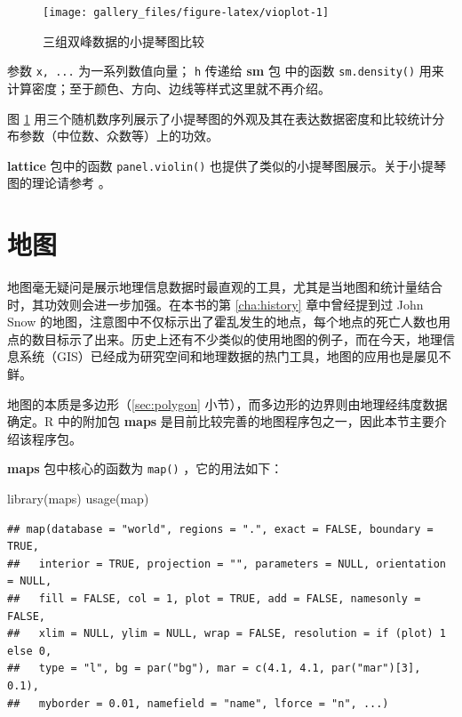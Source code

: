 \documentclass[
  b5paper,
  UTF8,twoside]{book}
\newenvironment{Shaded}{\begin{snugshade}}{\end{snugshade}}
\newcommand{\FunctionTok}[1]{\textcolor[rgb]{0.00,0.00,0.00}{#1}}
\newcommand{\NormalTok}[1]{#1}
\begin{document}
\begin{figure}

{\centering \texttt{[image: gallery\_files/figure-latex/vioplot-1]} 

}

\caption[三组双峰数据的小提琴图比较]{三组双峰数据的小提琴图比较}\label{fig:vioplot}
\end{figure}

参数 \texttt{x,\ ...} 为一系列数值向量； \texttt{h} 传递给 \textbf{sm} 包 \citep{sm} 中的函数 \texttt{sm.density()} 用来计算密度；至于颜色、方向、边线等样式这里就不再介绍。

图 \ref{fig:vioplot}
用三个随机数序列展示了小提琴图的外观及其在表达数据密度和比较统计分布参数（中位数、众数等）上的功效。

\textbf{lattice} 包中的函数 \texttt{panel.violin()} 也提供了类似的小提琴图展示。关于小提琴图的理论请参考 \citet{Hintze98}。

\hypertarget{sec:maps}{%
\section{地图}\label{sec:maps}}

地图毫无疑问是展示地理信息数据时最直观的工具，尤其是当地图和统计量结合时，其功效则会进一步加强。在本书的第 \ref{cha:history} 章中曾经提到过 John Snow 的地图，注意图中不仅标示出了霍乱发生的地点，每个地点的死亡人数也用点的数目标示了出来。历史上还有不少类似的使用地图的例子，而在今天，地理信息系统（GIS）已经成为研究空间和地理数据的热门工具，地图的应用也是屡见不鲜。

地图的本质是多边形（\ref{sec:polygon} 小节），而多边形的边界则由地理经纬度数据确定。R 中的附加包 \textbf{maps} \citep{maps} 是目前比较完善的地图程序包之一，因此本节主要介绍该程序包。

\textbf{maps} 包中核心的函数为 \texttt{map()} ，它的用法如下：

\begin{Shaded}
\begin{Highlighting}[]
\FunctionTok{library}\NormalTok{(maps)}
\FunctionTok{usage}\NormalTok{(map)}
\end{Highlighting}
\end{Shaded}

\begin{verbatim}
## map(database = "world", regions = ".", exact = FALSE, boundary = TRUE,
##   interior = TRUE, projection = "", parameters = NULL, orientation = NULL,
##   fill = FALSE, col = 1, plot = TRUE, add = FALSE, namesonly = FALSE,
##   xlim = NULL, ylim = NULL, wrap = FALSE, resolution = if (plot) 1 else 0,
##   type = "l", bg = par("bg"), mar = c(4.1, 4.1, par("mar")[3], 0.1),
##   myborder = 0.01, namefield = "name", lforce = "n", ...)
\end{verbatim}
\end{document}
